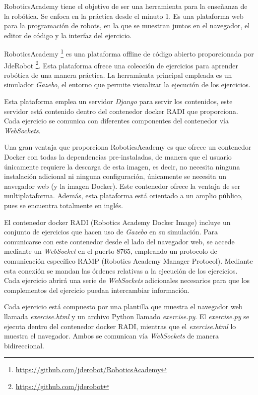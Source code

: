 \documentclass[a4paper, 12pt]{book}
\begin{document}
RoboticsAcademy tiene el objetivo de ser una herramienta para la enseñanza de la robótica. Se enfoca en la práctica desde el minuto 1. Es una plataforma web para la programación de robots, en la que se muestran juntos en el navegador, el editor de código y la interfaz del ejercicio.

RoboticsAcademy \footnote{\url{https://github.com/jderobot/RoboticsAcademy}} es una plataforma offline de código abierto proporcionada por JdeRobot \footnote{\url{https://github.com/jderobot}}. Esta plataforma ofrece una colección de ejercicios para aprender robótica de una manera práctica. La herramienta principal empleada es un simulador \emph{Gazebo}, el entorno que permite visualizar la ejecución de los ejercicios.


Esta plataforma emplea un servidor \emph{Django} para servir los contenidos, este servidor está contenido dentro del contenedor docker RADI que proporciona. Cada ejercicio se comunica con diferentes componentes del contenedor vía \emph{WebSockets}.

Una gran ventaja que proporciona RoboticsAcademy es que ofrece un contenedor Docker con todas la dependencias pre-instaladas, de manera que el usuario únicamente requiere la descarga de esta imagen, es decir, no necesita ninguna instalación adicional ni ninguna configuración, únicamente se necesita un navegador web (y la imagen Docker). Este contenedor ofrece la ventaja de ser multiplataforma. Además, esta plataforma está orientado a un amplio público, pues se encuentra totalmente en inglés.

El contenedor docker RADI (Robotics Academy Docker Image) incluye un conjunto de ejercicios que hacen uso de \emph{Gazebo} en su simulación. Para comunicarse con este contenedor desde el lado del navegador web, se accede mediante un \emph{WebSocket} en el puerto 8765, empleando un protocolo de comunicación específico RAMP (Robotics Academy Manager Protocol). Mediante esta conexión se mandan las órdenes relativas a la ejecución de los ejercicios. Cada ejercicio abrirá una serie de \emph{WebSockets} adicionales necesarios para que los complementos del ejercicio puedan intercambiar información.

Cada ejercicio está compuesto por una plantilla que muestra el navegador web llamada \emph{exercise.html} y un archivo Python llamado \emph{exercise.py}. El \emph{exercise.py} se ejecuta dentro del contenedor docker RADI, mientras que el \emph{exercise.html} lo muestra el navegador. Ambos se comunican vía \emph{WebSockets} de manera bidireccional.
\end{document}
